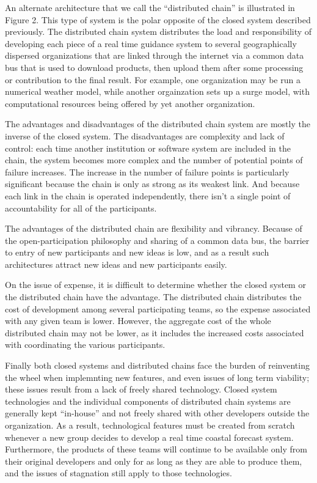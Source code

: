 \documentclass[12pt]{article}
\begin{document}
An alternate architecture that we call the ``distributed chain'' is 
illustrated in Figure 2. This type of system is the polar opposite 
of the closed system described previously. The distributed chain 
system distributes the load and responsibility of developing each 
piece of a real time guidance system to several geographically 
dispersed organizations that are linked through the internet via a 
common data bus that is used to download products, then upload them 
after some processing or contribution to the final result. For 
example, one organization may be run a numerical weather model, 
while another orgainzation sets up a surge model, with computational 
resources being offered by yet another organization. 

The advantages and disadvantages of the distributed chain system are 
mostly the inverse of the closed system. The disadvantages are 
complexity and lack of control: each time another institution or 
software system are included in the chain, the system becomes more 
complex and the number of potential points of failure increases. The 
increase in the number of failure points is particularly significant 
because the chain is only as strong as its weakest link. And because 
each link in the chain is operated independently, there isn't a 
single point of accountability for all of the participants.

The advantages of the distributed chain are flexibility and 
vibrancy. Because of the open-participation philosophy and sharing 
of a common data bus, the barrier to entry of new participants and 
new ideas is low, and as a result such architectures attract new 
ideas and new participants easily.

On the issue of expense, it is difficult to determine whether the 
closed system or the distributed chain have the advantage. The 
distributed chain distributes the cost of development among several 
participating teams, so the expense associated with any given team 
is lower. However, the aggregate cost of the whole distributed chain 
may not be lower, as it includes the increased costs associated with 
coordinating the various participants. 

Finally both closed systems and distributed chains face the burden 
of reinventing the wheel when implemnting new features, and even 
issues of long term viability; these issues result from a lack of 
freely shared technology. Closed system technologies and the 
individual components of distributed chain systems are generally 
kept ``in-house'' and not freely shared with other developers 
outside the organization. As a result, technological features must 
be created from scratch whenever a new group decides to develop a 
real time coastal forecast system. Furthermore, the products of 
these teams will continue to be available only from their original 
developers and only for as long as they are able to produce them, 
and the issues of stagnation still apply to those technologies.
\end{document}
